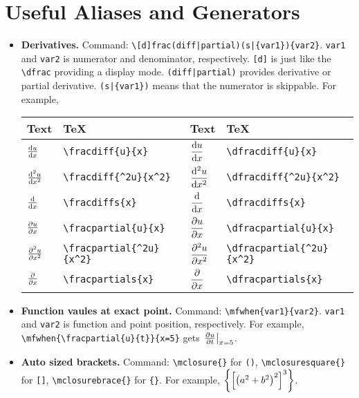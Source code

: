\documentclass{article}
\begin{document}
\section{Useful Aliases and Generators}
\begin{itemize}
\item \textbf{Derivatives.} Command: \lstinline`\[d]frac(diff|partial)(s|{var1}){var2}`. \lstinline`var1` and \lstinline`var2` is numerator and denominator, respectively. \lstinline`[d]` is just like the \lstinline`\dfrac` providing a display mode. \lstinline`(diff|partial)` provides derivative or partial derivative. \lstinline`(s|{var1})` means that the numerator is skippable. For example,

\renewcommand{\arraystretch}{2}
\begin{tabular}{*{4}{l}}
\toprule
Text & \TeX & Text & \TeX \\
\midrule
${\frac{\operatorname{d\!} {u}}{\operatorname{d\!} {x}}}$ & \lstinline`\fracdiff{u}{x}` & ${\dfrac{\operatorname{d\!} {u}}{\operatorname{d\!} {x}}}$ & \lstinline`\dfracdiff{u}{x}`  \\
${\frac{\operatorname{d\!} {^2u}}{\operatorname{d\!} {x^2}}}$ & \lstinline`\fracdiff{^2u}{x^2}` & ${\dfrac{\operatorname{d\!} {^2u}}{\operatorname{d\!} {x^2}}}$ & \lstinline`\dfracdiff{^2u}{x^2}`  \\
${{\frac{\operatorname{d\!} {}}{\operatorname{d\!} {x}}}}$ & \lstinline`\fracdiffs{x}` & ${{\dfrac{\operatorname{d\!} {}}{\operatorname{d\!} {x}}}}$ & \lstinline`\dfracdiffs{x}`  \\
${\frac{\partial {u}}{\partial {x}}}$ & \lstinline`\fracpartial{u}{x}` & ${\dfrac{\partial {u}}{\partial {x}}}$ & \lstinline`\dfracpartial{u}{x}`  \\
${\frac{\partial {^2u}}{\partial {x^2}}}$ & \lstinline`\fracpartial{^2u}{x^2}` & ${\dfrac{\partial {^2u}}{\partial {x^2}}}$ & \lstinline`\dfracpartial{^2u}{x^2}`  \\
${{\frac{\partial {}}{\partial {x}}}}$ & \lstinline`\fracpartials{x}` & ${{\dfrac{\partial {}}{\partial {x}}}}$ & \lstinline`\dfracpartials{x}` \\
\bottomrule
\end{tabular}
\renewcommand{\arraystretch}{1.25}

\item \textbf{Function vaules at exact point.} Command: \lstinline`\mfwhen{var1}{var2}`. \lstinline`var1` and \lstinline`var2` is function and point position, respectively. For example, \lstinline`\mfwhen{\fracpartial{u}{t}}{x=5}` gets ${\left.{{\frac{\partial {u}}{\partial {t}}}} \right|}_{x=5}$.

\item \textbf{Auto sized brackets.} Command: \lstinline`\mclosure{}` for \lstinline`()`, \lstinline`\mclosuresquare{}` for \lstinline`[]`, \lstinline`\mclosurebrace{}` for \lstinline`{}`. For example, ${\left\{ { {\left[ { {\left( {a^2 + b^2} \right)}^2 } \right]}^3 } \right\}}$.


\end{itemize}
\end{document}

